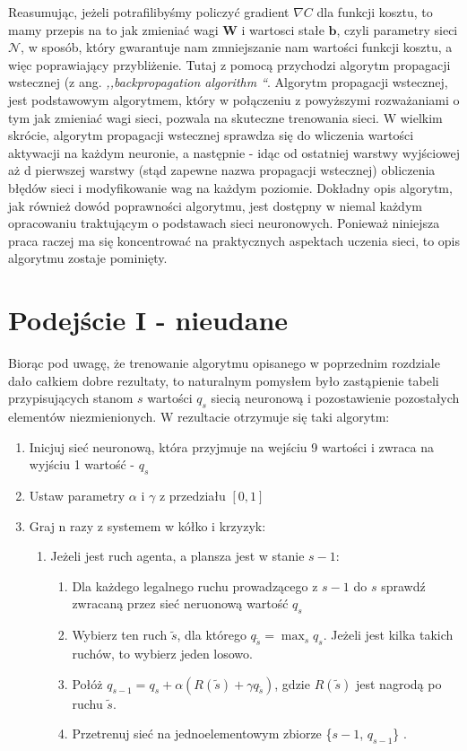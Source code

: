 \documentclass[licencjacka]{pracamgr}
\begin{document}
Reasumując, jeżeli potrafilibyśmy policzyć gradient $\nabla C$ dla funkcji kosztu, to mamy przepis na to jak zmieniać wagi $\mathbf{W}$ i wartosci stałe $\mathbf{b}$, czyli parametry sieci $\mathcal{N}$, w sposób, który gwarantuje nam zmniejszanie nam wartości funkcji kosztu, a więc poprawiający przybliżenie. Tutaj z pomocą przychodzi algorytm propagacji wstecznej (z ang. \textit{,,backpropagation algorithm ``}. Algorytm propagacji wstecznej, jest podstawowym algorytmem, który w połączeniu z powyższymi rozważaniami o tym jak zmieniać wagi sieci, pozwala na skuteczne trenowania sieci. W wielkim skrócie, algorytm propagacji wstecznej sprawdza się do wliczenia wartości aktywacji na każdym neuronie, a następnie - idąc od ostatniej warstwy wyjściowej aż d pierwszej warstwy (stąd zapewne nazwa propagacji wstecznej) obliczenia błędów sieci i modyfikowanie wag na każdym poziomie. Dokładny opis algorytm, jak również dowód poprawności algorytmu, jest dostępny w niemal każdym opracowaniu traktującym o podstawach sieci neuronowych. Ponieważ niniejsza praca raczej ma się koncentrować na praktycznych aspektach uczenia sieci, to opis algorytmu zostaje pominięty.

\section{Podejście I - nieudane}

Biorąc pod uwagę, że trenowanie algorytmu opisanego w poprzednim rozdziale dało całkiem dobre rezultaty, to naturalnym pomysłem było zastąpienie tabeli przypisujących stanom $s$ wartości $q_{s}$ siecią neuronową i pozostawienie pozostałych elementów niezmienionych. W rezultacie otrzymuje się taki algorytm:

\begin{enumerate}
	\item{Inicjuj sieć neuronową, która przyjmuje na wejściu 9 wartości i zwraca na wyjściu 1 wartość -  $q_{s}$}
	\item{Ustaw parametry $\alpha$ i $\gamma$ z przedziału $[0, 1]$}
	\item{Graj n razy z systemem w kółko i krzyzyk:}
	\begin{enumerate}
		\item{Jeżeli jest ruch agenta, a plansza jest w stanie $s-1$:}
		\begin{enumerate}
			\item{Dla każdego legalnego ruchu prowadzącego z $s-1$ do $s$  sprawdź zwracaną przez sieć neruonową wartość $q_{s}$}
			\item{Wybierz ten ruch $\tilde{s}$, dla którego $q_{\tilde{s}} =\max_{s} q_{s}$. Jeżeli jest kilka takich ruchów, to wybierz jeden losowo.}
			\item{Połóż $q_{s-1} = q_{s} + \alpha(R(\tilde{s}) + \gamma  q_{\tilde{s}} )$, gdzie $R(\tilde{s})$ jest nagrodą po ruchu $\tilde{s}$. }
			\item{Przetrenuj sieć na jednoelementowym zbiorze \{$s-1$, $q_{s-1}$\} }.
		\end{enumerate}
	\end{enumerate}
\end{enumerate}
\end{document}
